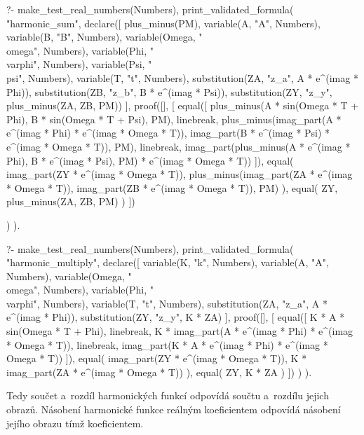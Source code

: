 \begin{prolog}
?-	make_test_real_numbers(Numbers),
	print_validated_formula(
		"harmonic_sum",
		declare([
			plus_minus(PM),
			variable(A, "A", Numbers),
			variable(B, "B", Numbers),
			variable(Omega, "\\omega", Numbers),
			variable(Phi, "\\varphi", Numbers),
			variable(Psi, "\\psi", Numbers),
			variable(T, "t", Numbers),
			substitution(ZA, "z_a", A * e^(imag * Phi)),
			substitution(ZB, "z_b", B * e^(imag * Psi)),
			substitution(ZY, "z_y", plus_minus(ZA, ZB, PM))
		],
			proof([],
			[
				equal([
					plus_minus(A * sin(Omega * T + Phi), B * sin(Omega * T + Psi), PM),
					linebreak,
					plus_minus(imag_part(A * e^(imag * Phi) * e^(imag * Omega * T)), imag_part(B * e^(imag * Psi) * e^(imag * Omega * T)), PM),
					linebreak,
					imag_part(plus_minus(A * e^(imag * Phi), B * e^(imag * Psi), PM) * e^(imag * Omega * T))
				]),
				equal(
					imag_part(ZY * e^(imag * Omega * T)),
					plus_minus(imag_part(ZA * e^(imag * Omega * T)), imag_part(ZB * e^(imag * Omega * T)), PM)
				),
				equal(
					ZY,
					plus_minus(ZA, ZB, PM)
				)
			])
				
		)
	).
\end{prolog}

\begin{prolog}
?-	make_test_real_numbers(Numbers),
	print_validated_formula(
		"harmonic_multiply",
		declare([
			variable(K, "k", Numbers),
			variable(A, "A", Numbers),
			variable(Omega, "\\omega", Numbers),
			variable(Phi, "\\varphi", Numbers),
			variable(T, "t", Numbers),
			substitution(ZA, "z_a", A * e^(imag * Phi)),
			substitution(ZY, "z_y", K * ZA)
		],
			proof([],
			[
				equal([
					K * A * sin(Omega * T + Phi),
					linebreak,
					K * imag_part(A * e^(imag * Phi) * e^(imag * Omega * T)),
					linebreak,
					imag_part(K * A * e^(imag * Phi) * e^(imag * Omega * T))
				]),
				equal(
					imag_part(ZY * e^(imag * Omega * T)),
					K * imag_part(ZA * e^(imag * Omega * T))
				),
				equal(
					ZY,
					K * ZA
				)
			])
		)
	).
\end{prolog}

Tedy součet a~rozdíl harmonických funkcí odpovídá součtu a~rozdílu jejich obrazů. Násobení harmonické funkce reálným koeficientem odpovídá násobení jejího obrazu tímž koeficientem.


